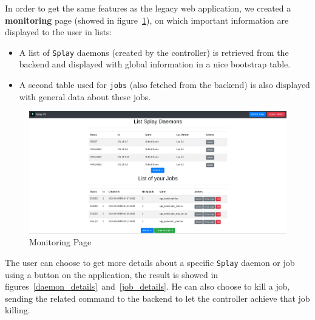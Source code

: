 \documentclass{eplmastersthesis}
\begin{document}
        In order to get the same features as the legacy web application,
        we created a \textbf{monitoring} page (showed in
        figure~\ref{monitor_web}), on which important
        information are displayed to the user in lists:

        \begin{itemize}
          \item A list of \texttt{Splay} daemons (created by the controller) is retrieved
          from the backend and displayed with global information in a nice
          bootstrap table.
          \item A second table used for \texttt{jobs} (also fetched from the backend) is also
          displayed with general data about these jobs.
        \end{itemize}

        \begin{figure}
          \centering
          \includegraphics[scale=0.27]{figures/monitor.png}
          \caption{\label{monitor_web} Monitoring Page}
        \end{figure}

        The user can choose to
        get more details about a specific \texttt{Splay} daemon or job using a button
        on the application, the result is showed in
        figures~\ref{daemon_details}~and~\ref{job_details}. He can also choose
        to kill a job, sending the related command to the backend to let the
        controller achieve that job killing.
\end{document}
